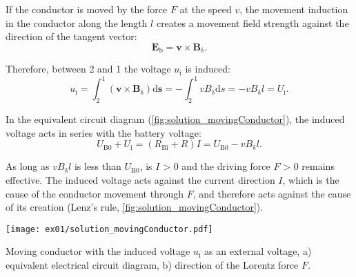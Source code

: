 \begin{solutionblock}
    If the conductor is moved by the force $F$ at the speed $v$, the movement induction in the conductor along the length $l$ creates a movement field strength against the direction of the tangent vector:
    \begin{equation}
        \boldsymbol{E}_{\mathrm{b}} = \boldsymbol{v} \times \boldsymbol{B}_{\mathrm{\updelta}}.
    \end{equation}
    
    Therefore, between 2 and 1 the voltage $u_{\mathrm{i}}$ is induced:
    \begin{equation}
        u_{\mathrm{i}}
        = \int_{2}^{1} (\boldsymbol{v} \times \boldsymbol{B}_{\updelta}) \mathrm{d}\boldsymbol{s}
        = - \int_{2}^{1} v B_{\updelta} \mathrm{d}s
        = -v B_{\updelta} l
        = U_{\mathrm{i}}.
    \end{equation}

    In the equivalent circuit diagram (\autoref{fig:solution_movingConductor}), the induced voltage acts in series with the battery voltage:
    \begin{equation}
        U_{\mathrm{B0}} + U_{\mathrm{i}} = (R_{\mathrm{Bi}} + R) I
        = U_{\mathrm{B0}} - v B_{\updelta} l.
    \end{equation}

    As long as $v B_{\updelta} l$ is less than $U_{\mathrm{B0}}$, is $I$ > 0 and the driving force $F$ > 0 remains effective. The induced voltage acts against the current direction $I$, which is the cause of the conductor movement through $F$, and therefore acts against the cause of its creation (Lenz's rule, \autoref{fig:solution_movingConductor}).

    \begin{solutionfigure}[ht]
        \centering
        \texttt{[image: ex01/solution\_movingConductor.pdf]}
        \caption{Moving conductor with the induced voltage $u_{\mathrm{i}}$ as an external voltage, a) equivalent electrical circuit diagram, b) direction of the Lorentz force $F$.}
        \label{fig:solution_movingConductor}
    \end{solutionfigure}

\end{solutionblock}




